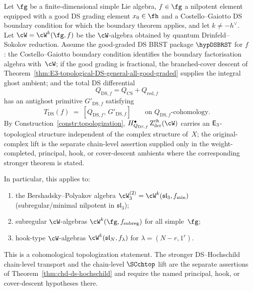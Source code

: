 \begin{theorem}\label{thm:E3-topological-DS-general}
Let $\fg$ be a finite-dimensional simple Lie algebra,
$f \in \fg$ a nilpotent element equipped with a good DS grading
element \(x_0\in\fh\) and a Costello--Gaiotto DS boundary condition
for which the boundary theorem applies, and let \(k\ne -h^\vee\). Let
$\cW = \cW^k(\fg, f)$ be the $\cW$-algebra obtained by
quantum Drinfeld--Sokolov reduction. Assume the good-graded DS BRST
package \(\hypDSBRST\) for \(f\): the Costello--Gaiotto boundary
condition identifies the boundary factorisation algebra with~\(\cW\);
if the good grading is fractional, the branched-cover descent of
Theorem~\ref{thm:E3-topological-DS-general-all-good-graded} supplies
the integral ghost ambient; and the total DS differential
\[
Q_{\mathrm{DS},f}=Q_{\mathrm{CS}}+Q_{\mathrm{red},f}
\]
has an antighost primitive \(G'_{\mathrm{DS},f}\) satisfying
\begin{equation}\label{eq:T-DS-BRST-general}
T_{\mathrm{DS}}(f) \;=\;
[Q_{\mathrm{DS},f},\, G'_{\mathrm{DS},f}]\qquad
\text{on $Q_{\mathrm{DS},f}$-cohomology.}
\end{equation}
By Construction~\textup{\ref{constr:topologization}},
$H_{Q_{\mathrm{DS},f}}^\bullet\Zder^{\mathrm{ch}}(\cW)$ carries an
$\mathsf{E}_3$-topological structure independent of the complex
structure of~$X$; the original-complex lift is the separate
chain-level assertion supplied only in the weight-completed,
principal, hook, or cover-descent ambients where the corresponding
stronger theorem is stated.

In particular, this applies to:
\begin{enumerate}[label=\textup{(\alph*)},nosep]
\item the Bershadsky--Polyakov algebra
 $\cW_3^{(2)} = \cW^k(\mathfrak{sl}_3, f_{\min})$
 \textup{(}subregular/minimal nilpotent in
 $\mathfrak{sl}_3$\textup{)};
\item subregular $\cW$-algebras
 $\cW^k(\fg, f_{\mathrm{subreg}})$ for all simple~$\fg$;
\item hook-type $\cW$-algebras
 $\cW^k(\mathfrak{sl}_N, f_\lambda)$ for
 $\lambda = (N{-}r, 1^r)$.
\end{enumerate}
This is a cohomological topologization statement. The stronger
DS--Hochschild chain-level transport and the chain-level
\(\SCchtop\) lift are the separate assertions of
Theorem~\ref{thm:chd-ds-hochschild} and require the named
principal, hook, or cover-descent hypotheses there.
\end{theorem}

